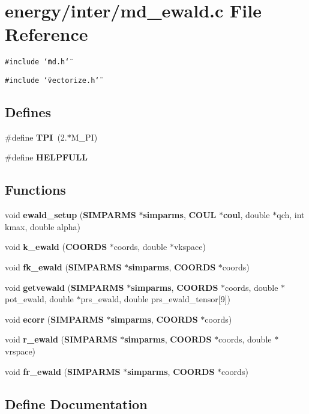 \section{energy/inter/md\_\-ewald.c File Reference}
\label{md__ewald_8c}
{\tt \#include \char`\"{}md.h\char`\"{}}\par
{\tt \#include \char`\"{}vectorize.h\char`\"{}}\par
\subsection*{Defines}
\begin{CompactItemize}
\item 
\#define {\bf TPI}~(2.$\ast$M\_\-PI)
\item 
\#define {\bf HELPFULL}
\end{CompactItemize}
\subsection*{Functions}
\begin{CompactItemize}
\item 
void {\bf ewald\_\-setup} ({\bf SIMPARMS} $\ast${\bf simparms}, {\bf COUL} $\ast${\bf coul}, double $\ast$qch, int kmax, double alpha)
\item 
void {\bf k\_\-ewald} ({\bf COORDS} $\ast$coords, double $\ast$vkspace)
\item 
void {\bf fk\_\-ewald} ({\bf SIMPARMS} $\ast${\bf simparms}, {\bf COORDS} $\ast$coords)
\item 
void {\bf getvewald} ({\bf SIMPARMS} $\ast${\bf simparms}, {\bf COORDS} $\ast$coords, double $\ast$pot\_\-ewald, double $\ast$prs\_\-ewald, double prs\_\-ewald\_\-tensor[9])
\item 
void {\bf ecorr} ({\bf SIMPARMS} $\ast${\bf simparms}, {\bf COORDS} $\ast$coords)
\item 
void {\bf r\_\-ewald} ({\bf SIMPARMS} $\ast${\bf simparms}, {\bf COORDS} $\ast$coords, double $\ast$vrspace)
\item 
void {\bf fr\_\-ewald} ({\bf SIMPARMS} $\ast${\bf simparms}, {\bf COORDS} $\ast$coords)
\end{CompactItemize}


\subsection{Define Documentation}
